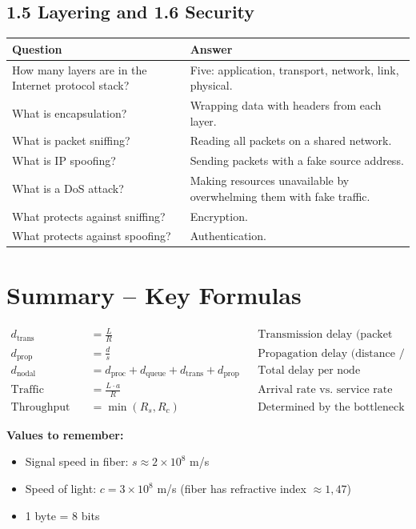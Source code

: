 \subsection{1.5 Layering and 1.6 Security}

\begin{exambox}
\begin{longtable}{p{6.5cm}p{7cm}}
\toprule
\textbf{Question} & \textbf{Answer} \\
\midrule
\endhead
How many layers are in the Internet protocol stack? & Five: application, transport, network, link, physical. \\
\midrule
What is encapsulation? & Wrapping data with headers from each layer. \\
\midrule
What is packet sniffing? & Reading all packets on a shared network. \\
\midrule
What is IP spoofing? & Sending packets with a fake source address. \\
\midrule
What is a DoS attack? & Making resources unavailable by overwhelming them with fake traffic. \\
\midrule
What protects against sniffing? & Encryption. \\
\midrule
What protects against spoofing? & Authentication. \\
\bottomrule
\end{longtable}
\end{exambox}

\section{Summary -- Key Formulas}

\begin{formulabox}
\begin{align}
d_{\text{trans}} &= \frac{L}{R} & &\text{Transmission delay (packet size / link rate)} \\[6pt]
d_{\text{prop}} &= \frac{d}{s} & &\text{Propagation delay (distance / signal speed)} \\[6pt]
d_{\text{nodal}} &= d_{\text{proc}} + d_{\text{queue}} + d_{\text{trans}} + d_{\text{prop}} & &\text{Total delay per node} \\[6pt]
\text{Traffic intensity} &= \frac{L \cdot a}{R} & &\text{Arrival rate vs.\ service rate} \\[6pt]
\text{Throughput} &= \min(R_s, R_c) & &\text{Determined by the bottleneck}
\end{align}

\textbf{Values to remember:}
\begin{itemize}[noitemsep]
    \item Signal speed in fiber: $s \approx 2 \times 10^8$ m/s
    \item Speed of light: $c = 3 \times 10^8$ m/s (fiber has refractive index $\approx 1{,}47$)
    \item 1 byte = 8 bits
\end{itemize}
\end{formulabox}
